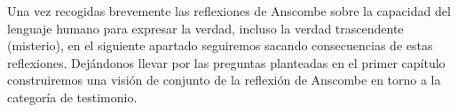 Una vez recogidas brevemente las reflexiones de Anscombe sobre la capacidad del lenguaje humano para expresar la verdad, incluso la verdad trascendente (misterio), en el siguiente apartado seguiremos sacando consecuencias de estas reflexiones. Dejándonos llevar por las preguntas planteadas en el primer capítulo construiremos una visión de conjunto de la reflexión de Anscombe en torno a la categoría de testimonio.
